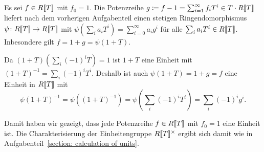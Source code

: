 \documentclass[a4paper, 10pt, numbers=noenddot]{scrartcl}
\begin{document}
\section{}

Es sei $f \in R[\![T]\!]$ mit $f_0 = 1$.
Die Potenzreihe $g \coloneqq f-1 = \sum_{i=1}^\infty f_i T^i \in T \cdot R[\![T]\!]$ liefert nach dem vorherigen Aufgabenteil einen stetigen Ringendomorphismus $\psi \colon R[\![T]\!] \to R[\![T]\!]$ mit $\psi(\sum_i a_i T^i) = \sum_{i=0}^\infty a_i g^i$ für alle $\sum_i a_i T^i \in R[\![T]\!]$.
Inbesondere gilt $f = 1 + g = \psi(1 + T)$.

Da $(1 + T)(\sum_i (-1)^i T) = 1$ ist $1 + T$ eine Einheit mit $(1 + T)^{-1} = \sum_i (-1)^i T^i$.
Deshalb ist auch $\psi(1 + T) = 1 + g = f$ eine Einheit in $R[\![T]\!]$ mit
\[
    \psi(1 + T)^{-1}
  = \psi\left( (1 + T)^{-1} \right)
  = \psi\left( \sum_i (-1)^i T^i \right)
  = \sum_i (-1)^i g^i.
\]

Damit haben wir gezeigt, dass jede Potenzreihe $f \in R[\![T]\!]$ mit $f_0 = 1$ eine Einheit ist.
Die Charakterisierung der Einheitengruppe $R[\![T]\!]^\times$ ergibt sich damit wie in Aufgabenteil~\ref{section: calculation of units}.
\end{document}
